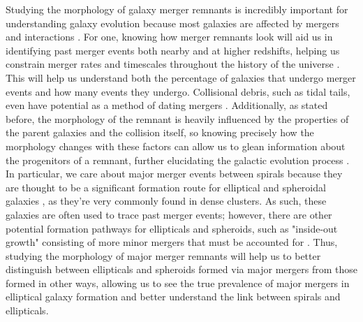 \documentclass[linenumbers]{aastex631}
\begin{document}
Studying the morphology of galaxy merger remnants is incredibly important for understanding galaxy evolution because most galaxies are affected by mergers and interactions \citep{Barnes+1992}.
For one, knowing how merger remnants look will aid us in identifying past merger events both nearby and at higher redshifts, helping us constrain merger rates and timescales throughout the history of the universe \citep{Lotz+2008}. 
This will help us understand both the percentage of galaxies that undergo merger events and how many events they undergo.
Collisional debris, such as tidal tails, even have potential as a method of dating mergers \cite{Duc2013}.
Additionally, as stated before, the morphology of the remnant is heavily influenced by the properties of the parent galaxies and the collision itself, so knowing precisely how the morphology changes with these factors can allow us to glean information about the progenitors of a remnant, further elucidating the galactic evolution process \citep{Barnes+1992}.
In particular, we care about major merger events between spirals because they are thought to be a significant formation route for elliptical and spheroidal galaxies \citep{Barnes+1992}, as they're very commonly found in dense clusters. 
As such, these galaxies are often used to trace past merger events; however, there are other potential formation pathways for ellipticals and spheroids, such as "inside-out growth" consisting of more minor mergers that must be accounted for \citep{Lotz+2008}.
Thus, studying the morphology of major merger remnants will help us to better distinguish between ellipticals and spheroids formed via major mergers from those formed in other ways, allowing us to see the true prevalence of major mergers in elliptical galaxy formation and better understand the link between spirals and ellipticals.
\end{document}
